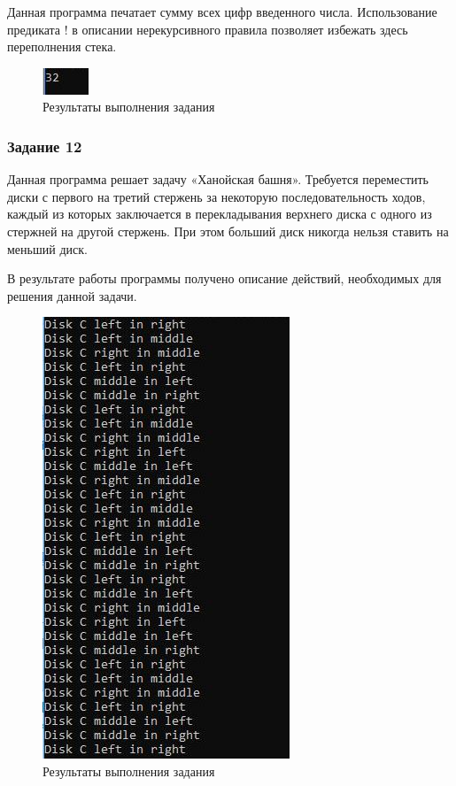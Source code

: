 \documentclass[14pt,a4paper,report]{report}
\begin{document}
Данная программа печатает сумму всех цифр введенного числа. Использование предиката ! в описании нерекурсивного правила позволяет избежать здесь переполнения стека.



\begin{figure}[h!]
	\centering
	\includegraphics[scale = 1.0]{images/d11.jpeg}
	\caption{Результаты выполнения задания}
\end{figure}

\subsubsection{Задание 12}

Данная программа решает задачу «Ханойская башня». Требуется переместить диски с первого на третий стержень за некоторую последовательность ходов, каждый из которых заключается в перекладывания верхнего диска с одного из стержней на другой стержень. При этом больший диск никогда нельзя ставить на меньший диск.

В результате работы программы получено описание действий, необходимых для решения данной задачи.



\begin{figure}[h!]
	\centering
	\includegraphics[scale = 1.0]{images/d12.jpeg}
	\caption{Результаты выполнения задания}
\end{figure}
\clearpage
\end{document}

